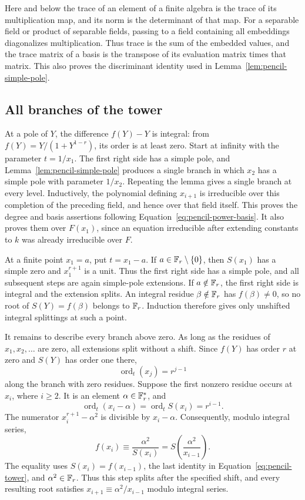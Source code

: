 Here and below the trace of an element of a finite algebra is the trace
of its multiplication map, and its norm is the determinant of that map.
For a separable field or product of separable fields, passing to a field
containing all embeddings diagonalizes multiplication.  Thus trace is
the sum of the embedded values, and the trace matrix of a basis is the
transpose of its evaluation matrix times that matrix.  This also proves
the discriminant identity used in Lemma~\ref{lem:pencil-simple-pole}.

\subsection{All branches of the tower}

At a pole of $Y$, the difference $f(Y)-Y$ is integral: from
$f(Y)=Y/(1+Y^{1-r})$, its order is at least zero.  Start at infinity with
the parameter $t=1/x_1$.  The first right side has a simple pole, and
Lemma~\ref{lem:pencil-simple-pole} produces a single branch in which
$x_2$ has a simple pole with parameter $1/x_2$.  Repeating the lemma gives
a single branch at every level.  Inductively, the polynomial defining
$x_{i+1}$ is irreducible over this completion of the preceding field,
and hence over that field itself.  This proves the degree and basis
assertions following Equation~\ref{eq:pencil-power-basis}.  It also proves
them over $F(x_1)$, since an equation irreducible after extending constants
to $k$ was already irreducible over $F$.

At a finite point $x_1=a$, put $t=x_1-a$.  If
$a\in\mathbb F_r\setminus\{0\}$, then $S(x_1)$ has a simple zero and
$x_1^{r+1}$ is a unit.  Thus the first right side has a simple pole, and
all subsequent steps are again simple-pole extensions.  If
$a\notin\mathbb F_r$, the first right side is integral and the extension splits.
An integral residue $\beta\notin\mathbb F_r$ has $f(\beta)\ne0$, so no root of
$S(Y)=f(\beta)$ belongs to $\mathbb F_r$.  Induction therefore gives only
unshifted integral splittings at such a point.

It remains to describe every branch above zero.  As long as the residues
of $x_1,x_2,\ldots$ are zero, all extensions split without a shift.  Since
$f(Y)$ has order $r$ at zero and $S(Y)$ has order one there,
\[
 \operatorname{ord}_t(x_j)=r^{j-1}
\]
along the branch with zero residues.  Suppose the first nonzero residue
occurs at $x_i$, where $i\geq2$.  It is an element
$\alpha\in\mathbb F_r^*$, and
\[
 \operatorname{ord}_t(x_i-\alpha)
 =\operatorname{ord}_t S(x_i)=r^{i-1}.
\]
The numerator $x_i^{r+1}-\alpha^2$ is divisible by $x_i-\alpha$.
Consequently, modulo integral series,
\begin{equation}\label{eq:pencil-first-shift}
 f(x_i)\equiv\frac{\alpha^2}{S(x_i)}
 =S\left(\frac{\alpha^2}{x_{i-1}}\right).
\end{equation}
The equality uses $S(x_i)=f(x_{i-1})$, the last identity in
Equation~\ref{eq:pencil-tower}, and $\alpha^2\in\mathbb F_r$.
Thus this step splits after the specified shift, and every resulting
root satisfies $x_{i+1}\equiv\alpha^2/x_{i-1}$ modulo integral series.


